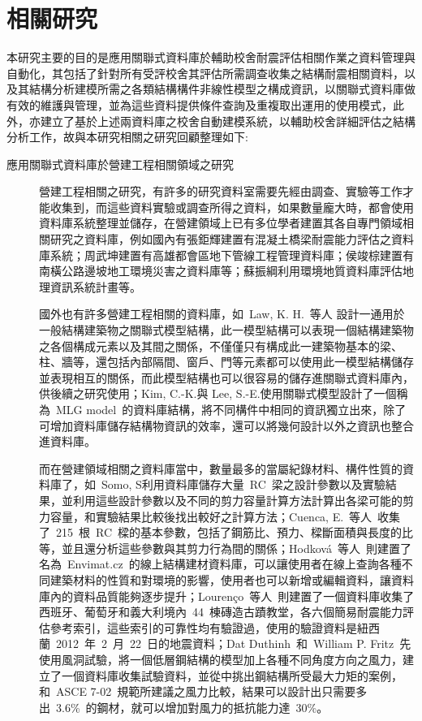 \renewcommand\thetable{\arabic{chapter}-\arabic{table}}
\renewcommand{\theequation}{\arabic{chapter}-\arabic{equation}}
\chapter{相關研究}

本研究主要的目的是應用關聯式資料庫於輔助校舍耐震評估相關作業之資料管理與自動化，其包括了針對所有受評校舍其評估所需調查收集之結構耐震相關資料，以及其結構分析建模所需之各類結構構件非線性模型之構成資訊，以關聯式資料庫做有效的維護與管理，並為這些資料提供條件查詢及重複取出運用的使用模式，此外，亦建立了基於上述兩資料庫之校舍自動建模系統，以輔助校舍詳細評估之結構分析工作，故與本研究相關之研究回顧整理如下:

\begin{description}
  \item[應用關聯式資料庫於營建工程相關領域之研究]
  營建工程相關之研究，有許多的研究資料室需要先經由調查、實驗等工作才能收集到，而這些資料實驗或調查所得之資料，如果數量龐大時，都會使用資料庫系統整理並儲存，在營建領域上已有多位學者建置其各自專門領域相關研究之資料庫，例如國內有張鉅輝\cite{chang2003master}建置有混凝土橋梁耐震能力評估之資料庫系統；周武坤\cite{chou2002master}建置有高雄都會區地下管線工程管理資料庫；侯竣棕\cite{hou2000master}建置有南橫公路邊坡地工環境災害之資料庫等；蘇振綱\cite{su2000master}利用環境地質資料庫評估地理資訊系統計畫等。

  國外也有許多營建工程相關的資料庫，如~Law, K. H.~等人\cite{law1990management} 設計一通用於一般結構建築物之關聯式模型結構，此一模型結構可以表現一個結構建築物之各個構成元素以及其間之關係，不僅僅只有構成此一建築物基本的梁、柱、牆等，還包括內部隔間、窗戶、門等元素都可以使用此一模型結構儲存並表現相互的關係，而此模型結構也可以很容易的儲存進關聯式資料庫內，供後續之研究使用；Kim, C.-K.與 Lee, S.-E.\cite{kim2000study}使用關聯式模型設計了一個稱為~MLG model~的資料庫結構，將不同構件中相同的資訊獨立出來，除了可增加資料庫儲存結構物資訊的效率，還可以將幾何設計以外之資訊也整合進資料庫。

  而在營建領域相關之資料庫當中，數量最多的當屬紀錄材料、構件性質的資料庫了，如~Somo, S\cite{somo2006modeling}利用資料庫儲存大量~RC~梁之設計參數以及實驗結果，並利用這些設計參數以及不同的剪力容量計算方法計算出各梁可能的剪力容量，和實驗結果比較後找出較好之計算方法；Cuenca, E.~等人\cite{Cuenca20131089}~收集了~215~根~RC~樑的基本參數，包括了鋼筋比、預力、樑斷面積與長度的比等，並且還分析這些參數與其剪力行為間的關係；Hodkov{\'a}~等人\cite{hodkova2011envimat}~則建置了名為~Envimat.cz~的線上結構建材資料庫，可以讓使用者在線上查詢各種不同建築材料的性質和對環境的影響，使用者也可以新增或編輯資料，讓資料庫內的資料品質能夠逐步提升；Louren{\c{c}}o~等人\cite{lourencco2013simplified}~則建置了一個資料庫收集了西班牙、葡萄牙和義大利境內~44~棟磚造古蹟教堂，各六個簡易耐震能力評估參考索引，這些索引的可靠性均有驗證過，使用的驗證資料是紐西蘭~2012~年~2~月~22~日的地震資料；Dat Duthinh~和~William P. Fritz\cite{duthinh2006nonlinear}~先使用風洞試驗，將一個低層鋼結構的模型加上各種不同角度方向之風力，建立了一個資料庫收集試驗資料，並從中挑出鋼結構所受最大力矩的案例，和~ASCE 7-02\cite{asce2002minimum}~規範所建議之風力比較，結果可以設計出只需要多出~3.6\%~的鋼材，就可以增加對風力的抵抗能力達~30\%。


\end{description}
